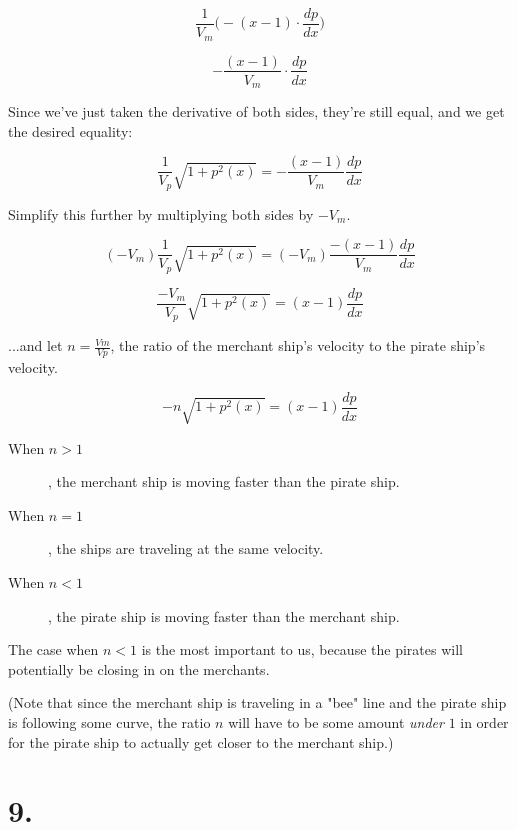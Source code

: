 \documentclass[11pt]{report}
\begin{document}
$$
\frac{1}{V_m}
\Big(
	-
	(x-1) \cdot \frac{dp}{dx}
\Big)
$$

$$
-\frac{(x-1)}{V_m}
\cdot \frac{dp}{dx}
$$

Since we've just taken the derivative of both sides, they're still equal, and
we get the desired equality:

$$
\frac{1}{V_p} \sqrt{1 + p^2(x)}
=
-\frac{(x-1)}{V_m} \frac{dp}{dx}
$$

Simplify this further by multiplying both sides by $-V_m$.

$$
(-V_m)
\frac{1}{V_p} \sqrt{1 + p^2(x)}
=
(-V_m)
\frac{-(x-1)}{V_m} \frac{dp}{dx}
$$

$$
\frac{-V_m}{V_p} \sqrt{1 + p^2(x)}
=
(x-1) \frac{dp}{dx}
$$

...and let $n = \frac{Vm}{Vp}$, the ratio of the
merchant ship's velocity to the pirate ship's velocity.

$$
-n \sqrt{1 + p^2(x)}
=
(x-1) \frac{dp}{dx}
$$

\begin{description}

	\item[When $n > 1$], the merchant ship is moving faster than the pirate ship.
	\item[When $n = 1$], the ships are traveling at the same velocity.
	\item[When $n < 1$], the pirate ship is moving faster than the
merchant ship.
\end{description}

The case when $n < 1$ is the most important to us, because the pirates will potentially be closing in on the merchants.

(Note that since the merchant ship is traveling in a "bee" line and the pirate ship is 
following some curve, the ratio $n$ will have to be some amount \emph{under} $1$ in order
for the pirate ship to actually get closer to the merchant ship.)

\section*{9.}
\end{document}
